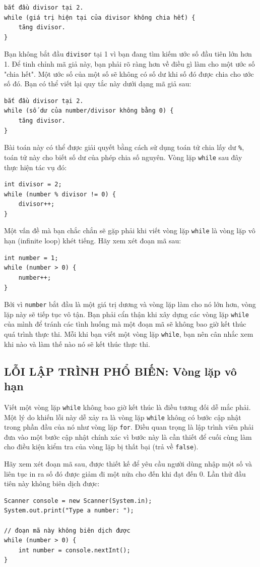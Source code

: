 \begin{verbatim}
bắt đầu divisor tại 2.
while (giá trị hiện tại của divisor không chia hết) {
    tăng divisor.
}
\end{verbatim}

Bạn không bắt đầu \texttt{divisor} tại 1 vì bạn đang tìm kiếm ước số đầu tiên lớn hơn 1. Để tinh chỉnh mã giả này, bạn phải rõ ràng hơn về điều gì làm cho một ước số "chia hết". Một ước số của một số sẽ không có số dư khi số đó được chia cho ước số đó. Bạn có thể viết lại quy tắc này dưới dạng mã giả sau:

\begin{verbatim}
bắt đầu divisor tại 2.
while (số dư của number/divisor không bằng 0) {
    tăng divisor.
}
\end{verbatim}

Bài toán này có thể được giải quyết bằng cách sử dụng toán tử chia lấy dư \texttt{\%}, toán tử này cho biết số dư của phép chia số nguyên. Vòng lặp \texttt{while} sau đây thực hiện tác vụ đó:

\begin{verbatim}
int divisor = 2;
while (number % divisor != 0) {
    divisor++;
}
\end{verbatim}

Một vấn đề mà bạn chắc chắn sẽ gặp phải khi viết vòng lặp \texttt{while} là vòng lặp vô hạn (infinite loop) khét tiếng. Hãy xem xét đoạn mã sau:

\begin{verbatim}
int number = 1;
while (number > 0) {
    number++;
}
\end{verbatim}

Bởi vì \texttt{number} bắt đầu là một giá trị dương và vòng lặp làm cho nó lớn hơn, vòng lặp này sẽ tiếp tục vô tận. Bạn phải cẩn thận khi xây dựng các vòng lặp \texttt{while} của mình để tránh các tình huống mà một đoạn mã sẽ không bao giờ kết thúc quá trình thực thi. Mỗi khi bạn viết một vòng lặp \texttt{while}, bạn nên cân nhắc xem khi nào và làm thế nào nó sẽ kết thúc thực thi.

\subsection*{LỖI LẬP TRÌNH PHỔ BIẾN: Vòng lặp vô hạn}
Viết một vòng lặp \texttt{while} không bao giờ kết thúc là điều tương đối dễ mắc phải. Một lý do khiến lỗi này dễ xảy ra là vòng lặp \texttt{while} không có bước cập nhật trong phần đầu của nó như vòng lặp \texttt{for}. Điều quan trọng là lập trình viên phải đưa vào một bước cập nhật chính xác vì bước này là cần thiết để cuối cùng làm cho điều kiện kiểm tra của vòng lặp bị thất bại (trả về \texttt{false}).

Hãy xem xét đoạn mã sau, được thiết kế để yêu cầu người dùng nhập một số và liên tục in ra số đó được giảm đi một nửa cho đến khi đạt đến 0. Lần thử đầu tiên này không biên dịch được:

\begin{verbatim}
Scanner console = new Scanner(System.in);
System.out.print("Type a number: "); 
 
// đoạn mã này không biên dịch được
while (number > 0) {
    int number = console.nextInt();
}
\end{verbatim}